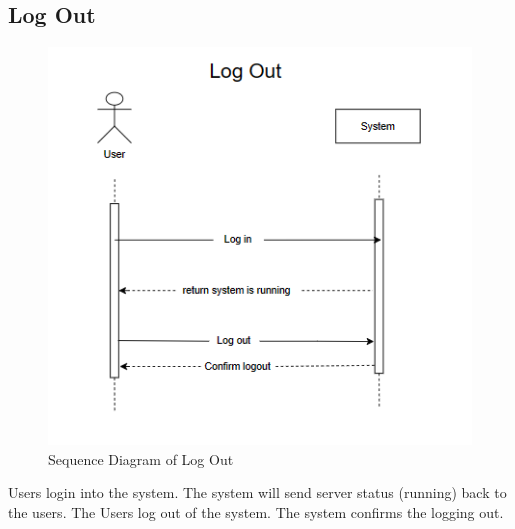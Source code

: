 \subsection{Log Out}
\begin{figure}[H]
\centering
  \includegraphics[max width=0.9\linewidth,origin = c]{chapters/4. system-modeling/picture/LogOut.png}
  \caption{Sequence Diagram of Log Out}%
\end{figure}
Users login into the system. The system will send server status (running) back to the users. The Users log out of the system. The system confirms the logging out.

